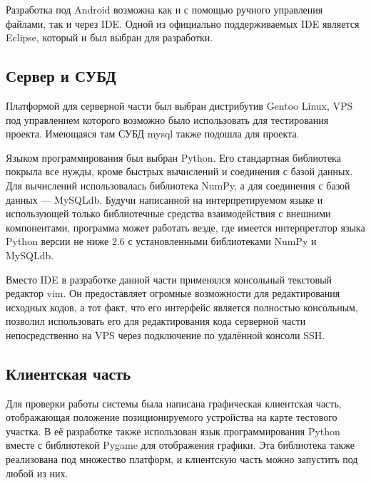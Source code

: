 Разработка под Android возможна как и с помощью ручного управления файлами, так и через IDE. Одной из официально поддерживаемых IDE является Eclipse, который и был выбран для разработки.

\subsection{Сервер и СУБД}
Платформой для серверной части был выбран дистрибутив Gentoo Linux, VPS под управлением которого возможно было использовать для тестирования проекта. Имеющаяся там СУБД mysql также подошла для проекта.

Языком программирования был выбран Python. Его стандартная библиотека покрыла все нужды, кроме быстрых вычислений и соединения с базой данных. Для вычислений использовалась библиотека NumPy\cite{numpy}, а для соединения с базой данных --- MySQLdb\cite{mysqldb}. Будучи написанной на интерпретируемом языке и использующей только библиотечные средства взаимодействия с внешними компонентами, программа может работать везде, где имеется интерпретатор языка Python версии не ниже 2.6 с установленными библиотеками NumPy и MySQLdb.

Вместо IDE в разработке данной части применялся консольный текстовый редактор vim\cite{vim}. Он предоставляет огромные возможности для редактирования исходных кодов, а тот факт, что его интерфейс является полностью консольным, позволил использовать его для редактирования кода серверной части непосредственно на VPS через подключение по удалённой консоли SSH.

\subsection{Клиентская часть}
Для проверки работы системы была написана графическая клиентская часть, отображающая положение позиционируемого устройства на карте тестового участка. В её разработке также использован язык программирования Python вместе с библиотекой Pygame\cite{pygame} для отображения графики. Эта библиотека также реализована под множество платформ, и клиентскую часть можно запустить под любой из них.

